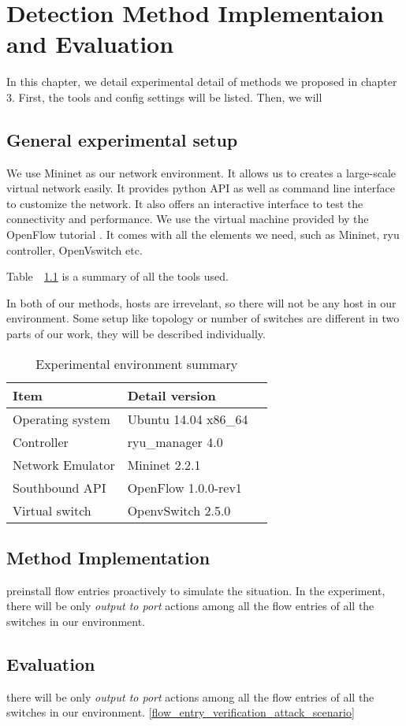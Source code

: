 \chapter{Detection Method Implementaion and Evaluation}
In this chapter, we detail experimental detail of methods we proposed in chapter 3. First, the tools and config settings will be listed. Then, we will 

\section{General experimental setup}
We use Mininet as our network environment. It allows us to creates a large-scale virtual network easily. 
It provides python API as well as command line interface to customize the network. It also offers an interactive interface to test the connectivity and performance. We use the virtual machine provided by the OpenFlow tutorial \cite{OFT}. It comes with all the elements we need, such as Mininet, ryu controller, OpenVswitch etc.

Table~~\ref{table:Experiment_table} is a summary of all the tools used. 

In both of our methods, hosts are irrevelant, so there will not be any host in our environment. Some setup like topology or number of switches are different in two parts of our work, they will be described individually.

\begin{table}[H]
\centering
\caption{Experimental environment summary}
\begin{tabular}{|l|p{4cm}|p{4.5cm}}
\hline Item & Detail version \\
\hline Operating system & Ubuntu 14.04 x86\_64 \\
\hline Controller & ryu\_manager 4.0 \\
\hline Network Emulator & Mininet 2.2.1\\
\hline Southbound API & OpenFlow 1.0.0-rev1 \\
\hline Virtual switch & OpenvSwitch 2.5.0 \\
\hline 
\end{tabular}
\label{table:Experiment_table}
\end{table}


\section{Method Implementation}
preinstall flow entries proactively to simulate the situation. 
In the experiment, there will be only \textit{output to port} actions among all the flow entries of all the switches in our environment. 
\subsection{}



\section{Evaluation}


there will be only \textit{output to port} actions among all the flow entries of all the switches in our environment. \ref{flow_entry_verification_attack_scenario} 